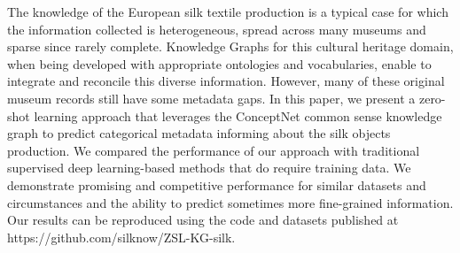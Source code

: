 The knowledge of the European silk textile production is a typical case for which the information collected is heterogeneous, spread across many museums and sparse since rarely complete. Knowledge Graphs for this cultural heritage domain, when being developed with appropriate ontologies and vocabularies, enable to integrate and reconcile this diverse information. However, many of these original museum records still have some metadata gaps. In this paper, we present a zero-shot learning approach that leverages the ConceptNet common sense knowledge graph to predict categorical metadata informing about the silk objects production. We compared the performance of our approach with traditional supervised deep learning-based methods that do require training data. We demonstrate promising and competitive performance for similar datasets and circumstances and the ability to predict sometimes more fine-grained information. Our results can be reproduced using the code and datasets published at https://github.com/silknow/ZSL-KG-silk.
